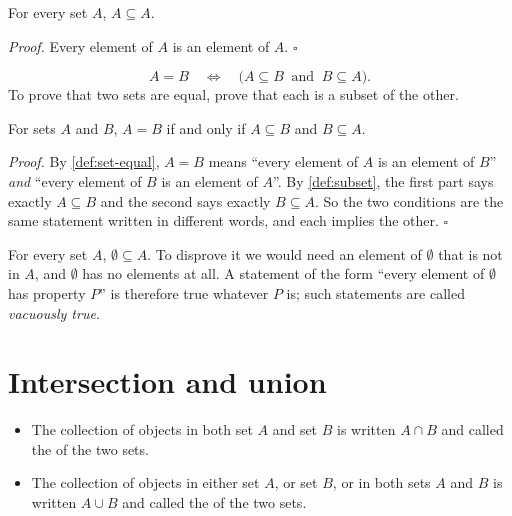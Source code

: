 \begin{proposition}
For every set $A$, $A\subseteq A$. 
\end{proposition}
\emph{Proof.} Every element of $A$ is an element of $A$. \hfill$\square$

\begin{core}
\[
A=B\quad\Longleftrightarrow\quad\big(A\subseteq B\ \text{ and }\ B\subseteq A\big).
\]
To prove that two sets are equal, prove that each is a subset of the other. 
\end{core}

\begin{proposition}
For sets $A$ and $B$, $A=B$ if and only if $A\subseteq B$ and $B\subseteq A$.
\end{proposition}
\emph{Proof.} By \cref{def:set-equal}, $A=B$ means ``every element of $A$ is an element of $B$'' \emph{and}
``every element of $B$ is an element of $A$''. By \cref{def:subset}, the first part says exactly
$A\subseteq B$ and the second says exactly $B\subseteq A$. So the two conditions are the same statement
written in different words, and each implies the other. \hfill$\square$

\begin{external}
For every set $A$, $\emptyset\subseteq A$. To disprove it we would need an element of $\emptyset$ that is not
in $A$, and $\emptyset$ has no elements at all. A statement of the form ``every element of $\emptyset$ has
property $P$'' is therefore true whatever $P$ is; such statements are called \emph{vacuously true}.
\end{external}

\section{Intersection and union}\label{sec:intersection-union}

\begin{definition}
\begin{itemize}
  \item The collection of objects in both set $A$ and set $B$ is written $A\cap B$ and called the
   of the two sets.
  \item The collection of objects in either set $A$, or set $B$, or in both sets $A$ and $B$ is written
  $A\cup B$ and called the  of the two sets.
\end{itemize}
\end{definition}

